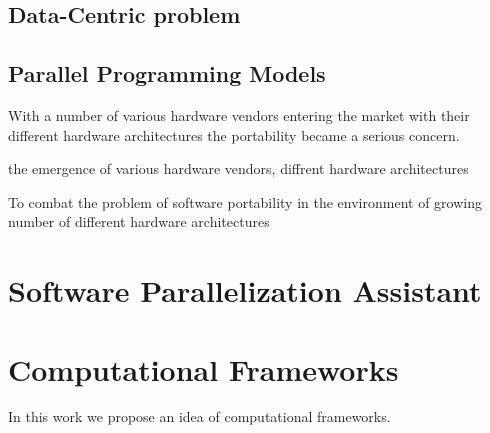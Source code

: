 \subsection{Data-Centric problem}
\subsection{Parallel Programming Models}
\quad With a number of various hardware vendors entering the market with their different hardware architectures the portability became a serious concern.  


the emergence of various hardware vendors, diffrent hardware architectures  

To combat the problem of software portability in the environment of growing number of different hardware architectures

\section{Software Parallelization Assistant}

\section{Computational Frameworks}
\quad In this work we propose an idea of computational frameworks. 


